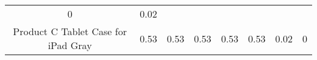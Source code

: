 \documentclass[]{article}
\begin{document}
\begin{longtable}[]{@{}ccllllll@{}}
\begin{minipage}[t]{0.05\columnwidth}
0\strut
\end{minipage} & \begin{minipage}[t]{0.05\columnwidth}\raggedright\strut
0.02\strut
\end{minipage}\tabularnewline
\begin{minipage}[t]{0.36\columnwidth}\centering\strut
Product C Tablet Case for iPad Gray\strut
\end{minipage} & \begin{minipage}[t]{0.05\columnwidth}\centering\strut
0.53\strut
\end{minipage} & \begin{minipage}[t]{0.05\columnwidth}\raggedright\strut
0.53\strut
\end{minipage} & \begin{minipage}[t]{0.05\columnwidth}\raggedright\strut
0.53\strut
\end{minipage} & \begin{minipage}[t]{0.05\columnwidth}\raggedright\strut
0.53\strut
\end{minipage} & \begin{minipage}[t]{0.05\columnwidth}\raggedright\strut
0.53\strut
\end{minipage} & \begin{minipage}[t]{0.05\columnwidth}\raggedright\strut
0.02\strut
\end{minipage} & \begin{minipage}[t]{0.05\columnwidth}\raggedright\strut
0\strut
\end{minipage}\tabularnewline
\bottomrule
\end{longtable}
\end{document}
